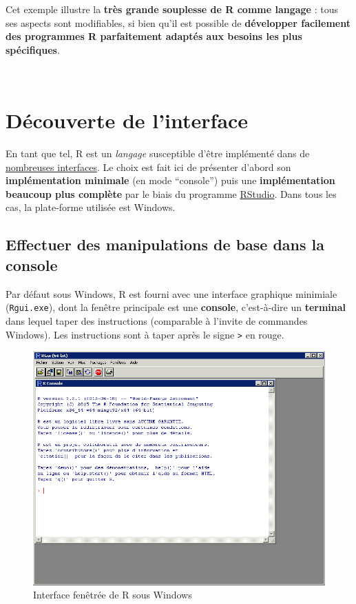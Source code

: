 \documentclass[12pt,twosided, notitlepage]{book}
\begin{document}
Cet exemple illustre la \textbf{très grande souplesse de R comme
langage} : tous ses aspects sont modifiables, si bien qu'il est possible
de \textbf{développer facilement des programmes R parfaitement adaptés
aux besoins les plus spécifiques}.

~

\section{Découverte de l'interface}\label{decouverte-de-linterface}

En tant que tel, R est un \emph{langage} susceptible d'être implémenté
dans de
\href{https://fr.wikipedia.org/wiki/R_(langage)\#Interfaces}{nombreuses
interfaces}. Le choix est fait ici de présenter d'abord son
\textbf{implémentation minimale} (en mode \enquote{console}) puis une
\textbf{implémentation beaucoup plus complète} par le biais du programme
\href{https://www.rstudio.com/}{RStudio}. Dans tous les cas, la
plate-forme utilisée est Windows.

\subsection{Effectuer des manipulations de base dans la
console}\label{effectuer-des-manipulations-de-base-dans-la-console}

Par défaut sous Windows, R est fourni avec une interface graphique
minimiale (\texttt{Rgui.exe}), dont la fenêtre principale est une
\textbf{console}, c'est-à-dire un \textbf{terminal} dans lequel taper
des instructions (comparable à l'invite de commandes Windows). Les
instructions sont à taper après le signe \texttt{\textgreater{}} en
rouge.

\begin{figure}
\centering
\includegraphics{../figures/Interface_R.png}
\caption{Interface fenêtrée de R sous Windows}
\end{figure}
\end{document}
